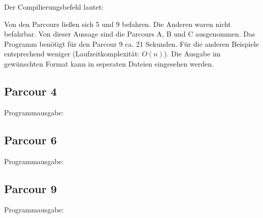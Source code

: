 Der Compilierungsbefehl lautet:


Von den Parcours ließen sich 5 und 9 befahren. Die Anderen waren nicht befahrbar. Von dieser Aussage sind die Parcours A, B und C ausgenommen.
Das Programm benötigt für den Parcour 9 ca. 21 Sekunden. Für die anderen Beispiele entsprechend weniger (Laufzeitkomplexität: \(O(n)\)).
Die Ausgabe im gewünschten Format kann in seperaten Dateien eingesehen werden.
\subsection{Parcour 4}
	Programmausgabe:\\
\subsection{Parcour 6}
	Programmausgabe:\\
\subsection{Parcour 9}
	Programmausgabe:\\

